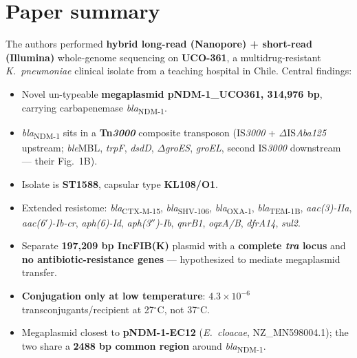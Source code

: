\documentclass[11pt]{article}
\begin{document}
\section{Paper summary}
The authors performed \textbf{hybrid long-read (Nanopore) + short-read
(Illumina)} whole-genome sequencing on \textbf{UCO-361}, a multidrug-resistant
\emph{K.\ pneumoniae} clinical isolate from a teaching hospital in Chile.
Central findings:
\begin{itemize}[leftmargin=1.5em,itemsep=2pt]
  \item Novel un-typeable \textbf{megaplasmid pNDM-1\_UCO361, 314{,}976 bp},
    carrying carbapenemase \emph{bla}\textsubscript{NDM-1}.
  \item \emph{bla}\textsubscript{NDM-1} sits in a \textbf{Tn\emph{3000}}
    composite transposon (IS\emph{3000} + $\Delta$IS\emph{Aba125} upstream;
    \emph{ble}MBL, \emph{trpF}, \emph{dsdD}, $\Delta$\emph{groES},
    \emph{groEL}, second IS\emph{3000} downstream --- their Fig.~1B).
  \item Isolate is \textbf{ST1588}, capsular type \textbf{KL108/O1}.
  \item Extended resistome: \emph{bla}\textsubscript{CTX-M-15},
    \emph{bla}\textsubscript{SHV-106}, \emph{bla}\textsubscript{OXA-1},
    \emph{bla}\textsubscript{TEM-1B}, \emph{aac(3)-IIa},
    \emph{aac(6$'$)-Ib-cr}, \emph{aph(6)-Id}, \emph{aph(3$''$)-Ib},
    \emph{qnrB1}, \emph{oqxA/B}, \emph{dfrA14}, \emph{sul2}.
  \item Separate \textbf{197{,}209 bp IncFIB(K)} plasmid with a
    \textbf{complete \emph{tra} locus} and \textbf{no antibiotic-resistance
    genes} --- hypothesized to mediate megaplasmid transfer.
  \item \textbf{Conjugation only at low temperature}:
    $4.3\times10^{-6}$ transconjugants/recipient at 27$^\circ$C, not
    37$^\circ$C.
  \item Megaplasmid closest to \textbf{pNDM-1-EC12} (\emph{E.\ cloacae},
    NZ\_MN598004.1); the two share a \textbf{2488 bp common region} around
    \emph{bla}\textsubscript{NDM-1}.
\end{itemize}
\end{document}
